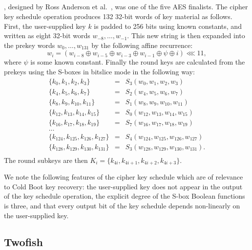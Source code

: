 \subsection{\Serpent}
\Serpent, designed by Ross Anderson et al.\ \cite{serpent}, was one of the five AES finalists. The cipher key schedule operation
produces 132 32-bit words of key material as follows. First, the user-supplied key $k$ is padded to 256 bits using known constants, and written as eight 32-bit words $w_{−8},\dots , w_{−1}$. This new string
is then expanded into the prekey words $w_0 ,\dots , w_{131}$ by the following affine recurrence:
$$w_i = (w_{i−8} \oplus w_{i−5} \oplus w_{i−3} \oplus w_{i−1} \oplus \psi \oplus i) \lll 11,$$ 
where $\psi$ is some known constant. Finally the round keys are calculated from the prekeys using the S-boxes in bitslice mode in the following way:
\begin{eqnarray*}
\{k_{ 0} , k_{ 1} , k_{ 2} , k_{ 3} \} &=& S_3(w_0 , w_1 , w_2 , w_3)\\
\{k_{ 4} , k_{ 5} , k_{ 6} , k_{ 7} \} &=& S_2(w_4 , w_5 , w_6 , w_7 )\\
\{k_{ 8} , k_{ 9} , k_{10} , k_{11} \} &=& S_1(w_8 , w_9 , w_{10} , w_{11} )\\
\{k_{12} , k_{13} , k_{14} , k_{15} \} &=& S_0(w_{12} , w_{13} , w_{14} , w_{15} )\\
\{k_{16} , k_{17} , k_{18} , k_{19} \} &=& S_7(w_{16} , w_{17} , w_{18} , w_{19} )\\
\dots & \\                                                                           
\{k_{124} , k_{125} , k_{126} , k_{127} \} &=& S_4 (w_{124} , w_{125} , w_{126} , w_{127} )\\
\{k_{128} , k_{129} , k_{130} , k_{131} \} &=& S_3 (w_{128} , w_{129} , w_{130} , w_{131} ).\\
\end{eqnarray*}
The round subkeys are then $K_i = \{k_{4i} , k_{4i+1} , k_{4i+2} , k_{4i+3}\}$. 

We note the following features of the cipher key schedule which are of relevance to Cold Boot key recovery: the user-supplied key does not appear in the output of the \Serpent key schedule operation, the explicit degree of the S-box Boolean functions is three, and that every output bit of the key schedule depends non-linearly on the user-supplied key.

\subsection{Twofish}
\label{subsec:twofish}

